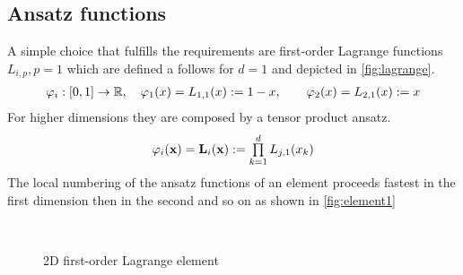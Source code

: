 \subsection{Ansatz functions}
A simple choice that fulfills the requirements are first-order Lagrange functions $L_{i,p},p=1$ which are defined a follows for $d=1$ and depicted in \cref{fig:lagrange}.
\begin{equation}
  \begin{array}{ll}
    \varphi_i: [0,1] \to \mathbb{R},\quad
    \varphi_1(x) = L_{1,1}(x) := 1-x, \qquad \varphi_2(x) = L_{2,1}(x) := x
  \end{array}
\end{equation}
For higher dimensions they are composed by a tensor product ansatz.
\begin{equation}
  \begin{array}{ll}
    \varphi_i(\textbf{x}) = \textbf{L}_{i}(\textbf{x}) := \prod\limits_{k=1}^{d} L_{j,1}(x_k)
  \end{array}
\end{equation}
The local numbering of the ansatz functions of an element proceeds fastest in the first dimension then in the second and so on as shown in \cref{fig:element1}

\begin{figure}
  \centering
  \,
  \,
  \caption{2D first-order Lagrange element}
  \label{fig:2d-lagrange}
\end{figure}

